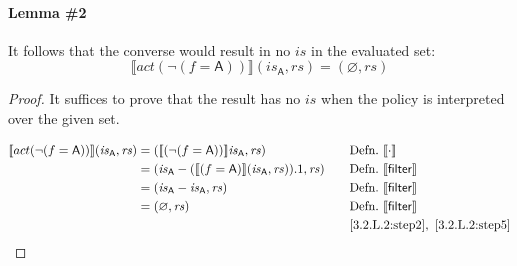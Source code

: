 \documentclass[12pt, letterpaper]{article}
\let\emptyset\varnothing
\newcommand\interp[1]{\llbracket #1 \rrbracket}
\begin{document}
 \paragraph{Lemma \#2}
     It follows that the converse would result in no $\mathit{is}$ in the evaluated set:
 \[
     \interp{ act(\neg (f=\mathsf{A})) } (\mathit{is}_{\mathsf{A}}, \mathit{rs}) = (\emptyset, \mathit{rs})
 \] %
 \begin{proof}
     It suffices to prove that the result has no $\mathit{is}$ when the policy is interpreted over the given set.
     \par\nobreak
     {\fontsize{10pt}{12pt}\selectfont
     \begin{alignat}{2}
         \setcounter{equation}{0}
         \label{3.2.L.2:step2}
         \interp{ act(\neg (f=\mathsf{A})) } (\mathit{is}_{\mathsf{A}}, \mathit{rs})
         &= 
         (\interp{ (\neg (f=\mathsf{A})) } \mathit{is}_{\mathsf{A}}, \mathit{rs})
         &&\quad \text{Defn.}\ \interp{\cdot}\\
         \label{3.2.L.2:step3}
         &=
         (\mathit{is}_{\mathsf{A}} - (\interp{ (f=\mathsf{A}) } (\mathit{is}_{\mathsf{A}}, \mathit{rs})).1, \mathit{rs})
         &&\quad \text{Defn.}\ \interp{\mathsf{filter}}\\
         \label{3.2.L.2:step4}
         &=
         (\mathit{is}_{\mathsf{A}} - \mathit{is}_{\mathsf{A}}, \mathit{rs})
         &&\quad \text{Defn.}\ \interp{\mathsf{filter}}\\
         \label{3.2.L.2:step5}
         &=
         (\emptyset, \mathit{rs})
         &&\quad \text{Defn.}\ \interp{\mathsf{filter}}\\
         \label{3.2.L.2:qed}
         &\qedhere
         &&\quad \ref{3.2.L.2:step2},\ \ref{3.2.L.2:step5}
     \end{alignat}
     }%
 \end{proof}
\end{document}
